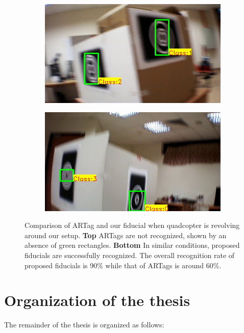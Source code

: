 \begin{figure}
\begin{subfigure}[b]{0.24\textwidth}
\end{subfigure}
\begin{subfigure}[b]{0.24\textwidth}
\includegraphics[width=\linewidth]{figures/fiducial/setup_our/output_2/output_35.jpg}
\end{subfigure}
\begin{subfigure}[b]{0.24\textwidth}
\includegraphics[width=\linewidth]{figures/fiducial/setup_our/output_6/output_943.jpg}
\end{subfigure}
\caption[Comparison of ARTag and our fiducial when quadcopter is
  revolving around our setup]{Comparison of ARTag and our fiducial when quadcopter is
  revolving around our setup. 
\textbf{Top} ARTags are not recognized, shown by an absence of green rectangles.
\textbf{Bottom} In similar conditions, proposed fiducials are successfully
recognized. The overall recognition rate of proposed fiducials is 90\% while that
of ARTags is around 60\%. }
\label{fig:fiducials_result}
\end{figure}
	
\section{Organization of the thesis}
The remainder of the thesis is organized as follows:\\

